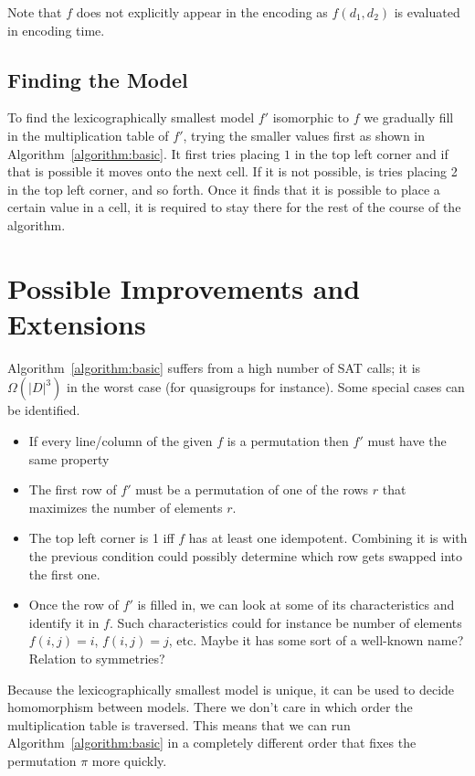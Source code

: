 \documentclass[11pt]{article}
\begin{document}
Note that $f$ does not explicitly appear in the encoding as $f(d_1, d_2)$ is evaluated in encoding time.

\subsection{Finding the Model}
To find the lexicographically  smallest model $f'$ isomorphic to $f$ we
gradually fill in the multiplication table of $f'$, trying the smaller values
first as shown in Algorithm~\ref{algorithm:basic}.  It first tries placing $1$
in the top left corner and if that is possible  it moves onto the  next cell. If
it is not possible,  is tries placing 2 in the top left corner, and so forth.
Once  it finds that it is possible to place a certain value in a cell,
it is required to stay there for the rest of the course of the algorithm.



\section{Possible Improvements and Extensions}

Algorithm~\ref{algorithm:basic} suffers from a high number of SAT calls; it is
$\Omega(|D|^3)$ in the worst case (for quasigroups  for instance). Some special
cases can be identified.

 \begin{itemize}
   \item  If every line/column of the given $f$ is a permutation then $f'$ must
     have the same property
   \item The first row of $f'$  must be a permutation of one of the rows $r$
     that maximizes the number of elements $r$.
   \item The top left corner is 1 iff $f$ has at least one idempotent.
     Combining it is with the previous condition  could possibly determine which row gets
     swapped into  the first one.
   \item Once the row of $f'$ is filled in, we can look at  some of its
     characteristics and identify it in $f$.  Such characteristics  could for
     instance be  number of elements $f(i, j)=i$, $f(i, j)=j$, etc.  Maybe it
     has some sort of a well-known name?  Relation to symmetries?
 \end{itemize}

Because the lexicographically  smallest model is unique, it can be used to
decide homomorphism between models. There we don't care in which order the
multiplication table is traversed. This means that we can run
Algorithm~\ref{algorithm:basic} in a completely different order that fixes the
permutation $\pi$ more quickly.
\end{document}
